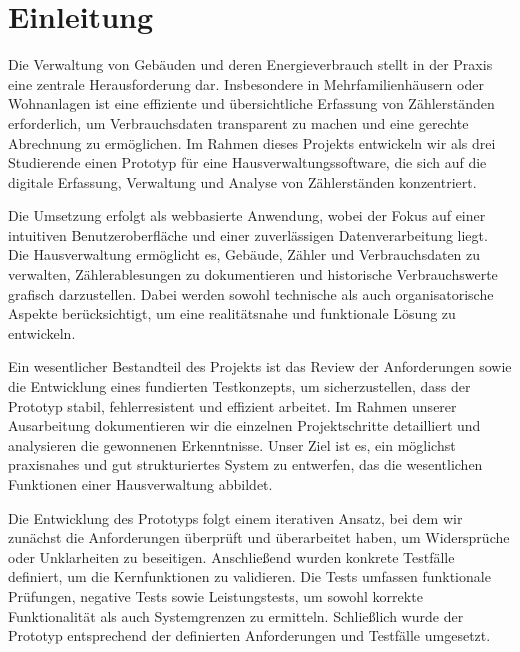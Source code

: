 \section{Einleitung}\label{Einleitung}


Die Verwaltung von Gebäuden und deren Energieverbrauch stellt in der Praxis eine zentrale Herausforderung dar.
Insbesondere in Mehrfamilienhäusern oder Wohnanlagen ist eine effiziente und übersichtliche Erfassung von Zählerständen erforderlich, um Verbrauchsdaten transparent zu machen und eine gerechte Abrechnung zu ermöglichen.
Im Rahmen dieses Projekts entwickeln wir als drei Studierende einen Prototyp für eine Hausverwaltungssoftware, die sich auf die digitale Erfassung, Verwaltung und Analyse von Zählerständen konzentriert.\par

Die Umsetzung erfolgt als webbasierte Anwendung, wobei der Fokus auf einer intuitiven Benutzeroberfläche und einer zuverlässigen Datenverarbeitung liegt.
Die Hausverwaltung ermöglicht es, Gebäude, Zähler und Verbrauchsdaten zu verwalten, Zählerablesungen zu dokumentieren und historische Verbrauchswerte grafisch darzustellen.
Dabei werden sowohl technische als auch organisatorische Aspekte berücksichtigt, um eine realitätsnahe und funktionale Lösung zu entwickeln.\par

Ein wesentlicher Bestandteil des Projekts ist das Review der Anforderungen sowie die Entwicklung eines fundierten Testkonzepts, um sicherzustellen, dass der Prototyp stabil, fehlerresistent und effizient arbeitet.
Im Rahmen unserer Ausarbeitung dokumentieren wir die einzelnen Projektschritte detailliert und analysieren die gewonnenen Erkenntnisse.
Unser Ziel ist es, ein möglichst praxisnahes und gut strukturiertes System zu entwerfen, das die wesentlichen Funktionen einer Hausverwaltung abbildet.\par

Die Entwicklung des Prototyps folgt einem iterativen Ansatz, bei dem wir zunächst die Anforderungen überprüft und überarbeitet haben, um Widersprüche oder Unklarheiten zu beseitigen.
Anschließend wurden konkrete Testfälle definiert, um die Kernfunktionen zu validieren. Die Tests umfassen funktionale Prüfungen, negative Tests sowie Leistungstests, um sowohl korrekte Funktionalität als auch Systemgrenzen zu ermitteln.
Schließlich wurde der Prototyp entsprechend der definierten Anforderungen und Testfälle umgesetzt.\par